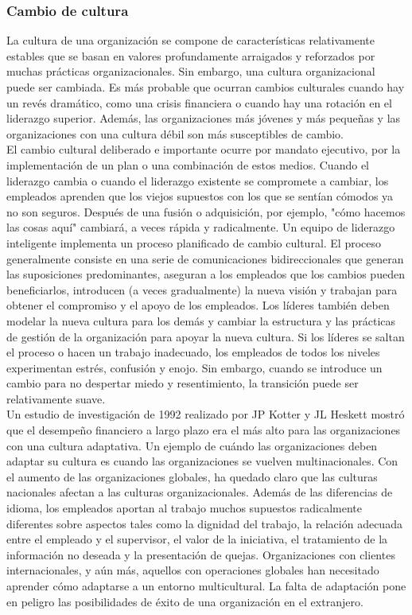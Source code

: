 \documentclass[10pt]{book}
\begin{document}
\subsubsection{Cambio de cultura}
La cultura de una organización se compone de características relativamente estables que se basan en valores profundamente arraigados y reforzados por muchas prácticas organizacionales. Sin embargo, una cultura organizacional puede ser cambiada. Es más probable que ocurran cambios culturales cuando hay un revés dramático, como una crisis financiera o cuando hay una rotación en el liderazgo superior. Además, las organizaciones más jóvenes y más pequeñas y las organizaciones con una cultura débil son más susceptibles de cambio.\\
El cambio cultural deliberado e importante ocurre por mandato ejecutivo, por la implementación de un plan o una combinación de estos medios. Cuando el liderazgo cambia o cuando el liderazgo existente se compromete a cambiar, los empleados aprenden que los viejos supuestos con los que se sentían cómodos ya no son seguros. Después de una fusión o adquisición, por ejemplo, "cómo hacemos las cosas aquí" cambiará, a veces rápida y radicalmente. Un equipo de liderazgo inteligente implementa un proceso planificado de cambio cultural. El proceso generalmente consiste en una serie de comunicaciones bidireccionales que generan las suposiciones predominantes, aseguran a los empleados que los cambios pueden beneficiarlos, introducen (a veces gradualmente) la nueva visión y trabajan para obtener el compromiso y el apoyo de los empleados. Los líderes también deben modelar la nueva cultura para los demás y cambiar la estructura y las prácticas de gestión de la organización para apoyar la nueva cultura. Si los líderes se saltan el proceso o hacen un trabajo inadecuado, los empleados de todos los niveles experimentan estrés, confusión y enojo. Sin embargo, cuando se introduce un cambio para no despertar miedo y resentimiento, la transición puede ser relativamente suave.\\
Un estudio de investigación de 1992 realizado por JP Kotter y JL Heskett mostró que el desempeño financiero a largo plazo era el más alto para las organizaciones con una cultura adaptativa. Un ejemplo de cuándo las organizaciones deben adaptar su cultura es cuando las organizaciones se vuelven multinacionales. Con el aumento de las organizaciones globales, ha quedado claro que las culturas nacionales afectan a las culturas organizacionales. Además de las diferencias de idioma, los empleados aportan al trabajo muchos supuestos radicalmente diferentes sobre aspectos tales como la dignidad del trabajo, la relación adecuada entre el empleado y el supervisor, el valor de la iniciativa, el tratamiento de la información no deseada y la presentación de quejas. Organizaciones con clientes internacionales, y aún más, aquellos con operaciones globales han necesitado aprender cómo adaptarse a un entorno multicultural. La falta de adaptación pone en peligro las posibilidades de éxito de una organización en el extranjero.\\
\end{document}
